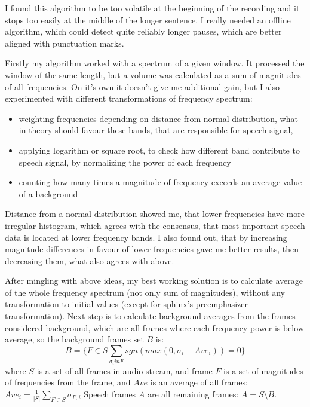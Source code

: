 \documentclass[12pt,a4paper,english]{article}
\begin{document}
I found this algorithm to be too volatile at the beginning of the recording and it stops too easily at the middle of the longer sentence. I really needed an offline algorithm, which could detect quite reliably longer pauses, which are better aligned with punctuation marks. \newline

Firstly my algorithm worked with a spectrum of a given window. It processed the window of the same length, but a volume was calculated as a sum of magnitudes of all frequencies. On it's own it doesn't give me additional gain, but I also experimented with different transformations of frequency spectrum:
\begin{itemize}
    \item weighting frequencies depending on distance from normal distribution, what in theory should favour these bands, that are responsible for speech signal,
    \item applying logarithm or square root, to check how different band contribute to speech signal, by normalizing the power of each frequency
    \item counting how many times a magnitude of frequency exceeds an average value of a background
\end{itemize}


\newpage

Distance from a normal distribution showed me, that lower frequencies have more irregular histogram, which agrees with the consensus, that most important speech data is located at lower frequency bands. \newline 
I also found out, that by increasing magnitude differences in favour of lower frequencies gave me better results, then decreasing them, what also agrees with above. \newline

After mingling with above ideas, my best working solution is to calculate average of the whole frequency spectrum (not only sum of magnitudes), without any transformation to initial values (except for sphinx's preemphasizer transformation).
Next step is to calculate background averages from the frames considered background, which are all frames where each frequency power is below average, so the background frames set $B$ is:
\begin{equation}
    B = \{ F \in S \sum_{\sigma_i in F} sgn(max(0, \sigma_i - Ave_i)) = 0 \}
\end{equation}
where $S$ is a set of all frames in audio stream, and frame $F$ is a set of magnitudes of frequencies from the frame,
and $Ave$ is an average of all frames: $Ave_i = \frac 1 {|S|} \sum_{F \in S} \sigma_{F, i}$
Speech frames $A$ are all remaining frames: $A = S \setminus B$. \newline
\end{document}
